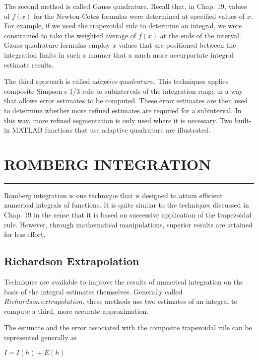 \documentclass[../main.tex]{subfiles}
\begin{document}
The second method is called Gauss quadrature. Recall that, in Chap. 19, values of
$f (x)$ for the Newton-Cotes formulas were determined at specified values of $x$. For example, if we used the trapezoidal rule to determine an integral, we were constrained to take the
weighted average of $f (x)$ at the ends of the interval. Gauss-quadrature formulas employ $x$
values that are positioned between the integration limits in such a manner that a much more
accurpartate integral estimate results.

The third approach is called $adaptive\, quadrature$. This techniques applies composite
Simpson s 1/3 rule to subintervals of the integration range in a way that allows error estimates to be computed. These error estimates are then used to determine whether more
refined estimates are required for a subinterval. In this way, more refined segmentation
is only used where it is necessary. Two built-in MATLAB functions that use adaptive quadrature are illustrated.


\vspace{0,6in}
\section{ROMBERG INTEGRATION}
\vspace{0,1in}
\hrule
\vspace{0,1in}
Romberg integration is one technique that is designed to attain efficient numerical integrals
of functions. It is quite similar to the techniques discussed in Chap. 19 in the sense that it
is based on successive application of the trapezoidal rule. However, through mathematical
manipulations, superior results are attained for less effort.


\subsection{Richardson Extrapolation}
Techniques are available to improve the results of numerical integration on the basis of the
integral estimates themselves. Generally called $Richardson\, extrapolation$, these methods
use two estimates of an integral to compute a third, more accurate approximation.


The estimate and the error associated with the composite trapezoidal rule can be represented generally as

	\begin{flushleft}
	$I=I(h)+E(h)$
	\end{flushleft}
	
\end{document}

